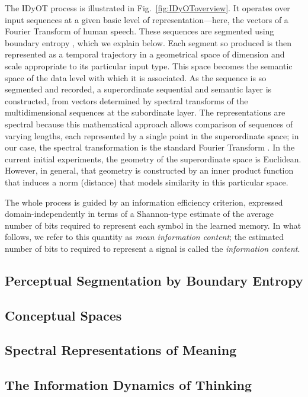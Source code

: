 \documentclass[runningheads]{llncs}
\begin{document}
The IDyOT process is illustrated in Fig.~\ref{fig:IDyOToverview}. It operates over 
input sequences at a given basic level of representation---here, the vectors of a Fourier Transform of human speech. These sequences are segmented using boundary entropy \cite{SproatShihEtAl94}, which we explain below. Each segment so produced is then represented as a temporal trajectory in a geometrical space of dimension and scale appropriate to its particular input type.  This space becomes the semantic space of the data level with which it is associated. As the sequence is so segmented and recorded, a superordinate sequential and semantic layer is constructed, from vectors determined by spectral transforms of the multidimensional sequences at the subordinate layer. The representations are spectral because this mathematical approach allows comparison of sequences of varying lengths, each represented by a single point in the superordinate space; in our case, the spectral transformation is the standard Fourier Transform \cite{?}. In the current initial experiments, the geometry of the superordinate space is Euclidean. However, in general, that geometry is constructed by an inner product function that induces a norm (distance) that models similarity in this particular space.

The whole process is guided by an information efficiency criterion, expressed domain-independently in terms of a Shannon-type estimate of the average number of bits required to represent each symbol in the learned memory. In what follows, we refer to this quantity as {\it mean information content}; the estimated number of bits to required to represent a signal is called the {\it information content}.




\subsection{Perceptual Segmentation by Boundary Entropy}
\subsection{Conceptual Spaces}
\cite{Gardenfors00,Gardenfors14}
\subsection{Spectral Representations of Meaning}
\cite[][\S7.2.5]{Wiggins18}
\subsection{The Information Dynamics of Thinking}
\end{document}
